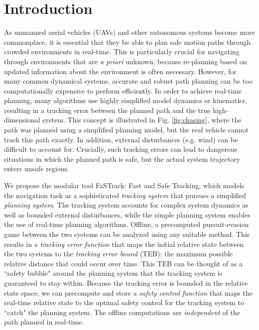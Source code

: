 \section{Introduction}
 As unmanned aerial vehicles (UAVs) and other autonomous systems become more commonplace, it is essential that they be able to plan safe motion paths through crowded environments in real-time. This is particularly crucial for navigating through environments that are \textit{a priori} unknown, because re-planning based on updated information about the environment is often necessary. 
 However, for many common dynamical systems, accurate and robust path planning can be too computationally expensive to perform efficiently. 
 In order to achieve real-time planning, many algorithms use highly simplified model dynamics or kinematics, resulting in a tracking error between the planned path and the true high-dimensional system. 
 This concept is illustrated in Fig. \ref{fig:chasing}, where the path was planned using a simplified planning model, but the real vehicle cannot track this path exactly. 
 In addition, external disturbances (e.g. wind) can be difficult to account for. Crucially, such tracking errors can lead to dangerous situations in which the planned path is safe, but the actual system trajectory enters unsafe regions.
 

We propose the modular tool FaSTrack: Fast and Safe Tracking, which models the navigation task as a sophisticated \textit{tracking system} that pursues a simplified \textit{planning system}. 
The tracking system accounts for complex system dynamics as well as bounded external disturbances, while the simple planning system enables the use of real-time planning algorithms. 
Offline, a precomputed pursuit-evasion game between the two systems can be analyzed using any suitable method. 
This results in a \textit{tracking error function} that maps the initial relative state between the two systems to the \textit{tracking error bound} (TEB): the maximum possible relative distance that could occur over time. 
This TEB can be thought of as a ``safety bubble" around the planning system that the tracking system is guaranteed to stay within. 
Because the tracking error is bounded in the relative state space, we can precompute and store a \textit{safety control function} that  maps the real-time relative state to the optimal safety control for the tracking system to ``catch" the planning system. 
The offline computations are \textit{independent} of the path planned in real-time.

